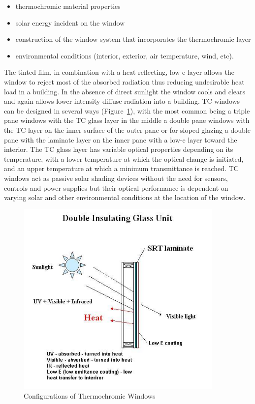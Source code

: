\begin{itemize}
\item
  thermochromic material properties
\item
  solar energy incident on the window
\item
  construction of the window system that incorporates the thermochromic layer
\item
  environmental conditions (interior, exterior, air temperature, wind, etc).
\end{itemize}

The tinted film, in combination with a heat reflecting, low-e layer allows the window to reject most of the absorbed radiation thus reducing undesirable heat load in a building. In the absence of direct sunlight the window cools and clears and again allows lower intensity diffuse radiation into a building. TC windows can be designed in several ways (Figure~\ref{fig:configurations-of-thermochromic-windows}), with the most common being a triple pane windows with the TC glass layer in the middle a double pane windows with the TC layer on the inner surface of the outer pane or for sloped glazing a double pane with the laminate layer on the inner pane with a low-e layer toward the interior. The TC glass layer has variable optical properties depending on its temperature, with a lower temperature at which the optical change is initiated, and an upper temperature at which a minimum transmittance is reached. TC windows act as passive solar shading devices without the need for sensors, controls and power supplies but their optical performance is dependent on varying solar and other environmental conditions at the location of the window.

\begin{figure}[hbtp] %
\centering
\includegraphics[width=0.9\textwidth, height=0.9\textheight, keepaspectratio=true]{media/image1017.png}
\caption{Configurations of Thermochromic Windows \protect \label{fig:configurations-of-thermochromic-windows}}
\end{figure}

